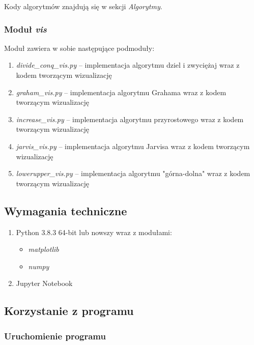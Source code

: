 \documentclass[11pt]{article}
\theoremstyle{remark} \newtheorem{definition}{def.}
\theoremstyle{definition} \newtheorem{twierdzenie}{tw.}
\begin{document}
Kody algorytmów znajdują się w sekcji \emph{Algorytmy}.

\subsubsection{Moduł \emph{vis}}

Moduł zawiera w sobie następujące podmoduły:

\begin{enumerate}
    \item   \emph{divide\_conq\_vis.py} -- implementacja algorytmu dziel i zwyciężaj wraz z kodem tworzącym wizualizację
    \item   \emph{graham\_vis.py} -- implementacja algorytmu Grahama wraz z kodem tworzącym wizualizację
    \item   \emph{increase\_vis.py} -- implementacja algorytmu przyrostowego wraz z kodem tworzącym wizualizację
    \item   \emph{jarvis\_vis.py} -- implementacja algorytmu Jarvisa wraz z kodem tworzącym wizualizację
    \item   \emph{lowerupper\_vis.py} -- implementacja algorytmu "górna-dolna" wraz z kodem tworzącym wizualizację
\end{enumerate}


\subsection{Wymagania techniczne}

\begin{enumerate}
    \item   Python 3.8.3 64-bit lub nowszy wraz z modułami:
            \begin{itemize}
                \item   \emph{matplotlib}
                \item   \emph{numpy}
            \end{itemize}
    \item   Jupyter Notebook
\end{enumerate}

\subsection{Korzystanie z programu}

\subsubsection{Uruchomienie programu}
\end{document}
